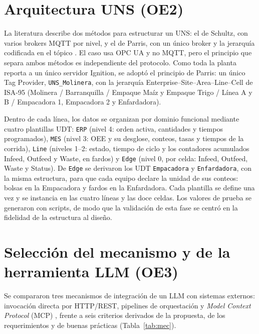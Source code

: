 \documentclass[11pt,letterpaper]{article}
\begin{document}
\section{Arquitectura UNS (OE2)}

La literatura describe dos métodos para estructurar un UNS: el de Schultz, con varios brokers MQTT por nivel, y el de Parris, con un único broker y la jerarquía codificada en el tópico \cite{DiazUNS2025}. El caso usa OPC UA y no MQTT, pero el principio que separa ambos métodos es independiente del protocolo. Como toda la planta reporta a un único servidor Ignition, se adoptó el principio de Parris: un único Tag Provider, \texttt{UNS\_Molinera}, con la jerarquía Enterprise--Site--Area--Line--Cell de ISA-95 (Molinera / Barranquilla / Empaque Maíz y Empaque Trigo / Línea A y B / Empacadora 1, Empacadora 2 y Enfardadora).

Dentro de cada línea, los datos se organizan por dominio funcional mediante cuatro plantillas UDT: \texttt{ERP} (nivel 4: orden activa, cantidades y tiempos programados), \texttt{MES} (nivel 3: OEE y su desglose, conteos, tasas y tiempos de la corrida), \texttt{Line} (niveles 1--2: estado, tiempo de ciclo y los contadores acumulados Infeed, Outfeed y Waste, en fardos) y \texttt{Edge} (nivel 0, por celda: Infeed, Outfeed, Waste y Status). De \texttt{Edge} se derivaron los UDT \texttt{Empacadora} y \texttt{Enfardadora}, con la misma estructura, para que cada equipo declare la unidad de sus conteos: bolsas en la Empacadora y fardos en la Enfardadora. Cada plantilla se define una vez y se instancia en las cuatro líneas y las doce celdas. Los valores de prueba se generaron con scripts, de modo que la validación de esta fase se centró en la fidelidad de la estructura al diseño.

\section{Selección del mecanismo y de la herramienta LLM (OE3)}

Se compararon tres mecanismos de integración de un LLM con sistemas externos: invocación directa por HTTP/REST, pipelines de orquestación y \textit{Model Context Protocol} (MCP) \cite{MastouriRESTtoMCP2026,EhteshamAgentProtocols2025,anthropic2024intro}, frente a seis criterios derivados de la propuesta, de los requerimientos y de buenas prácticas (Tabla~\ref{tab:mec}).
\end{document}
